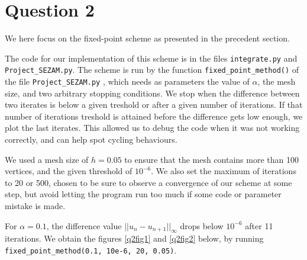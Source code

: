 \documentclass[11pt, a4paper, twoside]{article}
\begin{document}
\section*{Question 2}
We here focus on the fixed-point scheme as presented in the precedent section.

The code for our implementation of this scheme is in the files \verb+integrate.py+ and \verb+Project_SEZAM.py+. The scheme is run by the function \verb+fixed_point_method()+ of the file  \verb+Project_SEZAM.py+ , which needs as parameters the value of $\alpha$, the mesh size, and two arbitrary stopping conditions. We stop when the difference between two iterates is below a given treshold or after a given number of iterations. If that number of iterations treshold is attained before the difference gets low enough, we plot the last iterates. This allowed us to debug the code when it was not working correctly, and can help spot cycling behaviours.

We used a mesh size of $h=0.05$ to ensure that the mesh contains more than 100 vertices, and the given threshold of $10^{-6}$. We also set the maximum of iterations to 20 or 500, chosen to be sure to observe a convergence of our scheme at some step, but avoid letting the program run too much if some code or parameter mistake is made.

For $\alpha=0.1$, the difference value $||u_n -u_{n+1}||_\infty$ drops below $10^{-6}$ after 11 iterations. We obtain the figures \ref{q2fig1}  and \ref{q2fig2} below, by running \verb+fixed_point_method(0.1, 10e-6, 20, 0.05)+.
\end{document}
